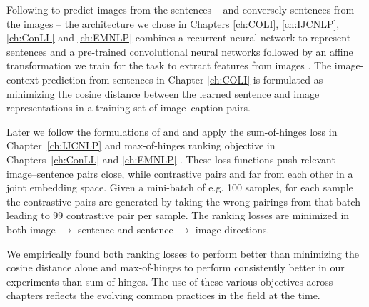 Following \cite{kiros2014unifying} to predict images from the sentences
-- and conversely sentences from the images --
the architecture we chose in
Chapters \ref{ch:COLI}, \ref{ch:IJCNLP}, \ref{ch:ConLL} and \ref{ch:EMNLP}  combines
a recurrent neural network to
represent sentences and a pre-trained convolutional neural networks
followed by an affine transformation we train for the task
to extract features from images .
The image-context prediction from sentences in
Chapter \ref{ch:COLI} is formulated  as minimizing the cosine distance
between the learned sentence  and image representations
in a training set of image--caption pairs.


Later we follow the formulations of \cite{vendrov2016order} and \cite{faghri2017vse++} and apply
the sum-of-hinges loss in Chapter~\ref{ch:IJCNLP} and max-of-hinges ranking objective
in Chapters~\ref{ch:ConLL} and \ref{ch:EMNLP} . These loss functions
push relevant image--sentence pairs close, while contrastive pairs  and
far from each other in a joint embedding space. Given a mini-batch of e.g. 100 samples, for each sample
the contrastive pairs are generated by taking the wrong pairings from that batch leading to
99 contrastive pair per sample. The ranking losses are minimized in both image $\rightarrow$ sentence
and sentence $\rightarrow$ image directions.

We empirically found both ranking losses to perform better than minimizing the cosine distance alone 
and max-of-hinges to perform consistently better in our experiments than sum-of-hinges. 
The use of these various objectives across
chapters  reflects the evolving common practices in the field at the time.



